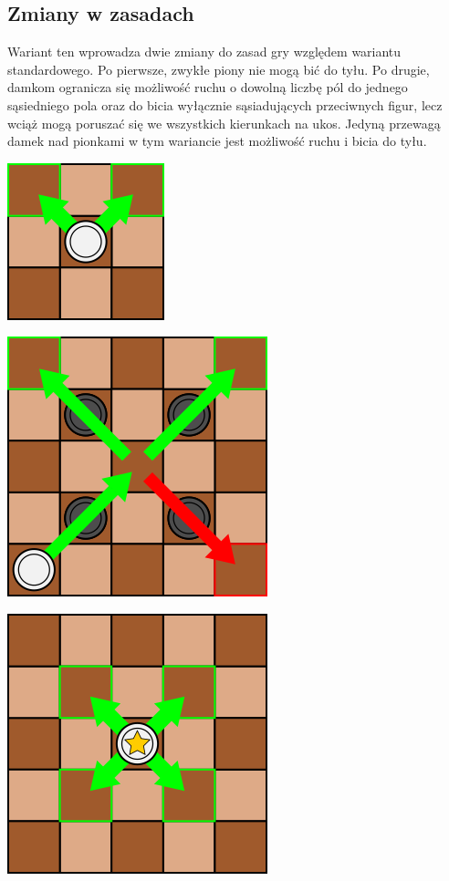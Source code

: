 \subsection{Zmiany w zasadach}

Wariant ten wprowadza dwie zmiany do zasad gry względem wariantu standardowego. Po pierwsze, zwykłe piony nie mogą bić do tyłu. Po drugie, damkom ogranicza się możliwość ruchu o dowolną liczbę pól do jednego sąsiedniego pola oraz do bicia wyłącznie sąsiadujących przeciwnych figur, lecz wciąż mogą poruszać się we wszystkich kierunkach na ukos. Jedyną przewagą damek nad pionkami w tym wariancie jest możliwość ruchu i bicia do tyłu.

\includegraphics[scale=.6]{graphics/warcaby_ruchyPionZwykle.png}

\includegraphics[scale=.6]{graphics/warcaby_ruchyPionBicia.png}

        \includegraphics[scale=.6]{graphics/warcaby_ruchyDamkaZwykle.png}

